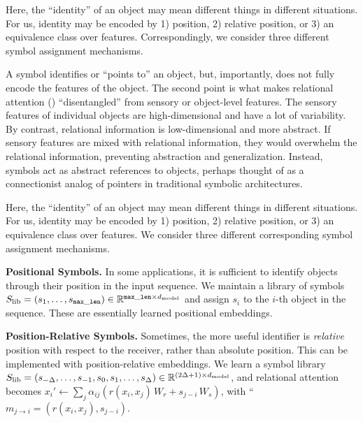 Here, the ``identity'' of an object may mean different things in different situations. For us, identity may be encoded by 1) position, 2) relative position, or 3) an equivalence class over features. Correspondingly, we consider three different symbol assignment mechanisms.

A symbol identifies or ``points to'' an object, but, importantly, does not fully encode the features of the object. The second point is what makes relational attention () ``disentangled'' from sensory or object-level features. The sensory features of individual objects are high-dimensional and have a lot of variability. By contrast, relational information is low-dimensional and more abstract. If sensory features are mixed with relational information, they would overwhelm the relational information, preventing abstraction and generalization. Instead, symbols act as abstract references to objects, perhaps thought of as a connectionist analog of pointers in traditional symbolic architectures.

Here, the ``identity'' of an object may mean different things in different situations. For us, identity may be encoded by 1) position, 2) relative position, or 3) an equivalence class over features. We consider three different corresponding symbol assignment mechanisms.

\textbf{Positional Symbols.} In some applications, it is sufficient to identify objects through their position in the input sequence. We maintain a library of symbols $S_\mathrm{lib} = (s_1, \ldots, s_{\mathtt{max\_len}}) \in \mathbb{R}^{\mathtt{max\_len} \times d_{\mathrm{model}}}$ and assign $s_i$ to the $i$-th object in the sequence. These are essentially learned positional embeddings.

\textbf{Position-Relative Symbols.} Sometimes, the more useful identifier is \textit{relative} position with respect to the receiver, rather than absolute position. This can be implemented with position-relative embeddings. We learn a symbol library $S_\mathrm{lib} = (s_{-\Delta}, \ldots, s_{-1}, s_0, s_1, \ldots, s_{\Delta}) \in \mathbb{R}^{(2 \Delta + 1) \times d_{\mathrm{model}}}$, and relational attention becomes $x_i' \gets \sum_{j} \alpha_{ij}  (r(x_i, x_j) \, W_r + s_{j-i} \,  W_s)$, with ``$m_{j \to i} = (r(x_i, x_j), s_{j-i})$.

